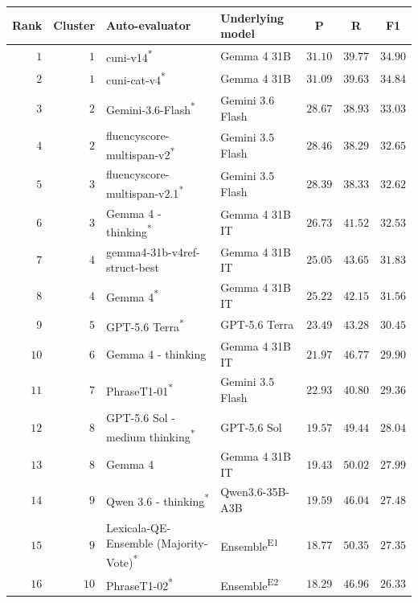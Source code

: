 \begin{table}[t]
\centering
\small
\begin{tabular}{rrllrrr}
\toprule
\multicolumn{1}{c}{Rank} & \multicolumn{1}{c}{Cluster} & Auto-evaluator & Underlying model & \multicolumn{1}{c}{P} & \multicolumn{1}{c}{R} & \multicolumn{1}{c}{F1} \\
\midrule
$1$ & $1$ & cuni-v14\textsuperscript{*} & Gemma 4 31B & $31.10$ & $39.77$ & $34.90$ \\
$2$ & $1$ & cuni-cat-v4\textsuperscript{*} & Gemma 4 31B & $31.09$ & $39.63$ & $34.84$ \\
\rowcolor{black!15} $3$ & $2$ & Gemini-3.6-Flash\textsuperscript{*} & Gemini 3.6 Flash & $28.67$ & $38.93$ & $33.03$ \\
$4$ & $2$ & fluencyscore-multispan-v2\textsuperscript{*} & Gemini 3.5 Flash & $28.46$ & $38.29$ & $32.65$ \\
$5$ & $3$ & fluencyscore-multispan-v2.1\textsuperscript{*} & Gemini 3.5 Flash & $28.39$ & $38.33$ & $32.62$ \\
\rowcolor{black!15} $6$ & $3$ & Gemma 4 - thinking\textsuperscript{*} & Gemma 4 31B IT & $26.73$ & $41.52$ & $32.53$ \\
$7$ & $4$ & gemma4-31b-v4ref-struct-best & Gemma 4 31B IT & $25.05$ & $43.65$ & $31.83$ \\
\rowcolor{black!15} $8$ & $4$ & Gemma 4\textsuperscript{*} & Gemma 4 31B IT & $25.22$ & $42.15$ & $31.56$ \\
\rowcolor{black!15} $9$ & $5$ & GPT-5.6 Terra\textsuperscript{*} & GPT-5.6 Terra & $23.49$ & $43.28$ & $30.45$ \\
\rowcolor{black!15} $10$ & $6$ & Gemma 4 - thinking & Gemma 4 31B IT & $21.97$ & $46.77$ & $29.90$ \\
$11$ & $7$ & PhraseT1-01\textsuperscript{*} & Gemini 3.5 Flash & $22.93$ & $40.80$ & $29.36$ \\
\rowcolor{black!15} $12$ & $8$ & GPT-5.6 Sol - medium thinking\textsuperscript{*} & GPT-5.6 Sol & $19.57$ & $49.44$ & $28.04$ \\
\rowcolor{black!15} $13$ & $8$ & Gemma 4 & Gemma 4 31B IT & $19.43$ & $50.02$ & $27.99$ \\
\rowcolor{black!15} $14$ & $9$ & Qwen 3.6 - thinking\textsuperscript{*} & Qwen3.6-35B-A3B & $19.59$ & $46.04$ & $27.48$ \\
$15$ & $9$ & Lexicala-QE-Ensemble (Majority-Vote)\textsuperscript{*} & Ensemble\textsuperscript{E1} & $18.77$ & $50.35$ & $27.35$ \\
$16$ & $10$ & PhraseT1-02\textsuperscript{*} & Ensemble\textsuperscript{E2} & $18.29$ & $46.96$ & $26.33$ \\

\end{tabular}
\end{table}
